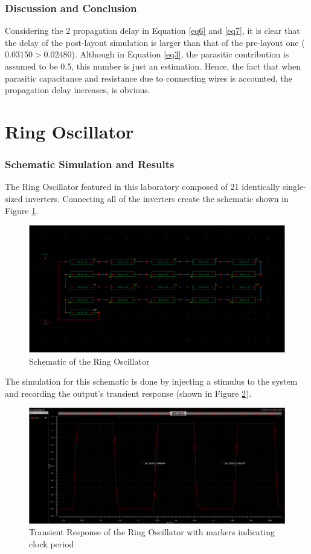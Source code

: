 \documentclass[letterpaper, 11pt]{article}
\begin{document}
\section{Discussion and Conclusion}
\label{sec:disc_and_concl}

Considering the 2 propagation delay in Equation \ref{eq6} and \ref{eq7}, it is clear that the delay of the post-layout simulation is larger than that of the pre-layout one ($0.03150 > 0.02480$). Although in Equation \ref{eq3}, the parasitic contribution is assumed to be 0.5, this number is just an estimation. Hence, the fact that when parasitic capacitance and resistance due to connecting wires is accounted, the propagation delay increases, is obvious. 


\part{Ring Oscillator}
\label{part2}

\section{Schematic Simulation and Results}

The Ring Oscillator featured in this laboratory composed of 21 identically single-sized inverters. Connecting all of the inverters create the schematic shown in Figure \ref{fig8}.

\begin{figure}[htb!]
	\centering
	\includegraphics[width=0.7\linewidth]{ring_osc_schematic.png}
	\caption{Schematic of the Ring Oscillator}
	\label{fig8}
\end{figure}

The simulation for this schematic is done by injecting a stimulus to the system and recording the output's transient response (shown in Figure \ref{fig9}).

\begin{figure}[htb!]
	\centering
	\includegraphics[width=0.75\linewidth]{ring_osc_clock_period.png}
	\caption{Transient Response of the Ring Oscillator with markers indicating clock period}
	\label{fig9}
\end{figure}
\end{document}

